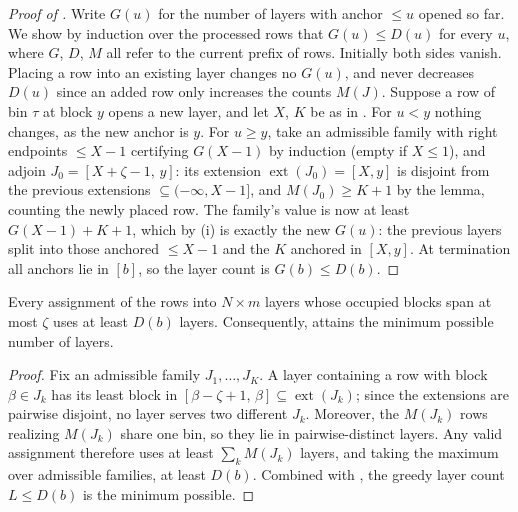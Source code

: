 \begin{proof}[Proof of ]
Write $G(u)$ for the number of layers with anchor $\le u$ opened so
far. We show by induction over the processed rows that $G(u)\le D(u)$
for every $u$, where $G$, $D$, $M$ all refer to the current prefix of
rows. Initially both sides vanish. Placing a row into an existing layer
changes no $G(u)$, and never decreases $D(u)$ since an added row only
increases the counts $M(J)$. Suppose a row of bin $\tau$ at block $y$
opens a new layer, and let $X$, $K$ be as in
. For $u<y$ nothing changes, as the new
anchor is $y$. For $u\ge y$, take an admissible family with right
endpoints $\le X-1$ certifying $G(X-1)$ by induction (empty if
$X\le1$), and adjoin $J_0=[X+\zeta-1,\,y]$: its extension
$\operatorname{ext}(J_0)=[X,y]$ is disjoint from the previous
extensions $\subseteq(-\infty,X-1]$, and $M(J_0)\ge K+1$ by the lemma,
counting the newly placed row. The family's value is now at least
$G(X-1)+K+1$, which by (i) is exactly the new
$G(u)$: the previous layers split into those anchored $\le X-1$ and the
$K$ anchored in $[X,y]$. At termination all anchors lie in $[b]$, so
the layer count is $G(b)\le D(b)$.
\end{proof}

\begin{proposition}[Optimality]\label{prop:opt-Lprime}
Every assignment of the rows into $N\times m$ layers whose occupied
blocks span at most $\zeta$ uses at least $D(b)$ layers. Consequently,
 attains the minimum possible number of layers.
\end{proposition}

\begin{proof}
Fix an admissible family $J_1,\ldots,J_K$. A layer containing a row
with block $\beta\in J_k$ has its least block in
$[\beta-\zeta+1,\,\beta]\subseteq\operatorname{ext}(J_k)$; since the
extensions are pairwise disjoint, no layer serves two different $J_k$.
Moreover, the $M(J_k)$ rows realizing $M(J_k)$ share one bin, so they
lie in pairwise-distinct layers. Any valid assignment therefore uses at
least $\sum_k M(J_k)$ layers, and taking the maximum over admissible
families, at least $D(b)$. Combined with , the
greedy layer count $L \le D(b)$ is the minimum possible.
\end{proof}


